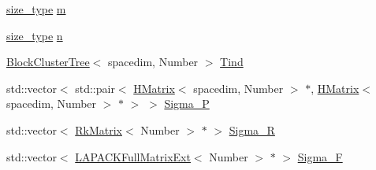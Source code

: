 \begin{DoxyCompactItemize}
\item 
\hyperlink{classHMatrix_a5ca8dc549783d38371a01ecd621ecb34}{size\+\_\+type} \hyperlink{classHMatrix_aa5523463043e4d542eae17d262bd22ad}{m}
\item 
\hyperlink{classHMatrix_a5ca8dc549783d38371a01ecd621ecb34}{size\+\_\+type} \hyperlink{classHMatrix_ab5ae2eb472f81f80653ed4411629c2d1}{n}
\item 
\hyperlink{classBlockClusterTree}{Block\+Cluster\+Tree}$<$ spacedim, Number $>$ \hyperlink{classHMatrix_a12da9454687e5ca15837d63e2bf0b595}{Tind}
\item 
std\+::vector$<$ std\+::pair$<$ \hyperlink{classHMatrix}{H\+Matrix}$<$ spacedim, Number $>$ $\ast$, \hyperlink{classHMatrix}{H\+Matrix}$<$ spacedim, Number $>$ $\ast$ $>$ $>$ \hyperlink{classHMatrix_a3d96d0252ef8c873ae06cf87874acaf3}{Sigma\+\_\+P}
\item 
std\+::vector$<$ \hyperlink{classRkMatrix}{Rk\+Matrix}$<$ Number $>$ $\ast$ $>$ \hyperlink{classHMatrix_a04d341b4e606d1be2d71b8ea636efe7b}{Sigma\+\_\+R}
\item 
std\+::vector$<$ \hyperlink{classLAPACKFullMatrixExt}{L\+A\+P\+A\+C\+K\+Full\+Matrix\+Ext}$<$ Number $>$ $\ast$ $>$ \hyperlink{classHMatrix_aa659b6df63d533432ec1a24435cd9c40}{Sigma\+\_\+F}
\end{DoxyCompactItemize}
